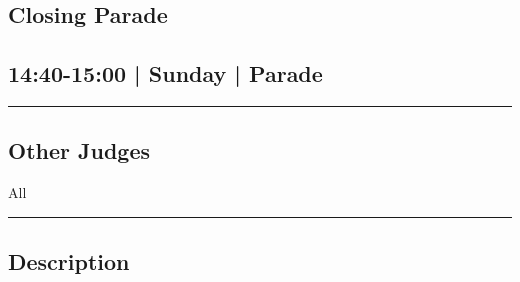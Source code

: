 \documentclass[10pt, A5]{article}
\begin{document}
	

		\begin{framed}
			\begin{minipage}{\textwidth}

			\setcounter{section}{118}
							\section{Closing Parade}
						
			\subsection*{14:40-15:00 | Sunday | Parade}

			\vspace{0.25cm}
			\hrule
			\vspace{0.25cm}


			\subsection*{Other Judges}
							All

					\vspace{0.25cm}
			\hrule
			\vspace{0.25cm}

			\begin{minipage}{\textwidth}
			\subsection*{\faListAlt \: Description}
			
			\end{minipage}


	\end{minipage}
	\end{framed}

	
	
	

	\clearpage
\end{document}
